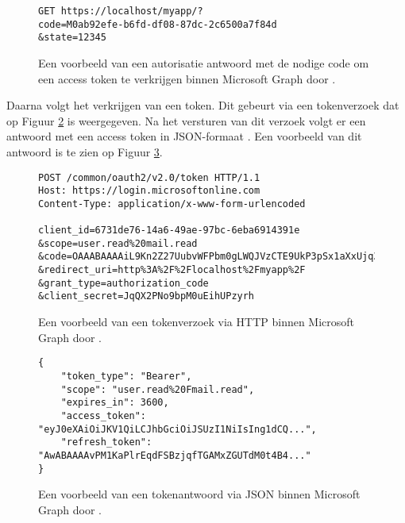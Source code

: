 \begin{figure}[h!]
    \scriptsize
    \begin{verbatim}
GET https://localhost/myapp/?
code=M0ab92efe-b6fd-df08-87dc-2c6500a7f84d
&state=12345
    \end{verbatim}    
    \caption[Voorbeeld Microsoft Graph Authorization Response]{Een voorbeeld van een autorisatie antwoord met de nodige code om een access token te verkrijgen binnen Microsoft Graph door \textcite{Microsoft2023r}.}
    \label{MSGAR}
\end{figure}

Daarna volgt het verkrijgen van een token. Dit gebeurt via een tokenverzoek dat op Figuur \ref{HTR} is weergegeven. Na het versturen van dit verzoek volgt er een antwoord met een access token in \ac{JSON}-formaat \autocite{Microsoft2023r}. Een voorbeeld van dit antwoord is te zien op Figuur \ref{HTRES}. \\ 

\begin{figure}[!h]
    \scriptsize
    \begin{verbatim}
POST /common/oauth2/v2.0/token HTTP/1.1
Host: https://login.microsoftonline.com
Content-Type: application/x-www-form-urlencoded
        
client_id=6731de76-14a6-49ae-97bc-6eba6914391e
&scope=user.read%20mail.read
&code=OAAABAAAAiL9Kn2Z27UubvWFPbm0gLWQJVzCTE9UkP3pSx1aXxUjq3n8b2JRLk4OxVXr...
&redirect_uri=http%3A%2F%2Flocalhost%2Fmyapp%2F
&grant_type=authorization_code
&client_secret=JqQX2PNo9bpM0uEihUPzyrh
    \end{verbatim}
    \caption[Voorbeeld User token Request Microsoft Graph]{Een voorbeeld van een tokenverzoek via \ac{HTTP} binnen Microsoft Graph door \textcite{Microsoft2023r}.}
    \label{HTR}
\end{figure}

\begin{figure}[!h]
    \scriptsize
    \begin{verbatim}
{
    "token_type": "Bearer",
    "scope": "user.read%20Fmail.read",
    "expires_in": 3600,
    "access_token": "eyJ0eXAiOiJKV1QiLCJhbGciOiJSUzI1NiIsIng1dCQ...",
    "refresh_token": "AwABAAAAvPM1KaPlrEqdFSBzjqfTGAMxZGUTdM0t4B4..."
}        
    \end{verbatim}    
    \caption[Voorbeeld User token Response Microsoft Graph]{Een voorbeeld van een tokenantwoord via \ac{JSON} binnen Microsoft Graph door \textcite{Microsoft2023r}.}
    \label{HTRES}
\end{figure}

